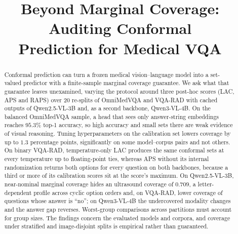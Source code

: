 \documentclass[a4paper,conference]{IEEEtran}
\newcommand{\rtag}[1]{}
\begin{document}
\title{Beyond Marginal Coverage: Auditing Conformal\\
Prediction for Medical VQA}

\author{
}

\maketitle

\begin{abstract}
Conformal prediction can turn a frozen medical vision--language model into a
set-valued predictor with a finite-sample marginal coverage guarantee. We ask
what that guarantee leaves unexamined, varying the protocol around three
post-hoc scores (LAC, APS and RAPS) over 20 re-splits of OmniMedVQA and
VQA-RAD with cached outputs of Qwen2.5-VL-3B and, as a second backbone,
Qwen3-VL-4B.\rtag{R1.1} On the balanced OmniMedVQA sample, a head that sees
only answer-string embeddings reaches $95.3\%$ top-1 accuracy, so high accuracy
and small sets there are weak evidence of visual reasoning. Tuning
hyperparameters on the calibration set lowers coverage by up to $1.3$
percentage points, significantly on some model--corpus pairs and not others.
On binary VQA-RAD, temperature-only LAC produces the same conformal sets at
every temperature up to floating-point ties, whereas APS without its internal
randomization returns both options for every question on both backbones,
because a third or more of its calibration scores sit at the score's
maximum.\rtag{R2.1} On Qwen2.5-VL-3B, near-nominal marginal coverage hides an
ultrasound coverage of $0.709$, a letter-dependent profile across cyclic option
orders and, on VQA-RAD, lower coverage of questions whose answer is ``no''; on
Qwen3-VL-4B the undercovered modality changes and the answer gap reverses.
Worst-group comparisons across partitions must account for group sizes. The
findings concern the evaluated models and corpora, and coverage under
stratified and image-disjoint splits is empirical rather than
guaranteed.\rtag{R2.6}
\end{abstract}
\end{document}
